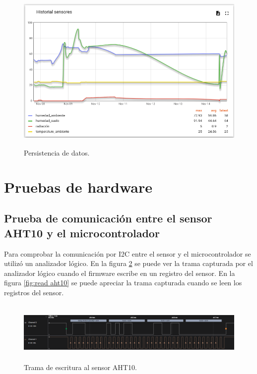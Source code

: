 \begin{figure}[h!]
  \centering
    \includegraphics[width=\linewidth, height=8cm]{./Figures/persistencia_datos4.png}
  \caption{Persistencia de datos.}
    \label{fig:Persistencia de datos}
\end{figure}

\section{Pruebas de hardware}
\subsection{Prueba de comunicación entre el sensor AHT10 y el microcontrolador}
Para comprobar la comunicación por I2C entre el sensor y el microcontrolador se utilizó un analizador lógico.
En la figura \ref{fig:write aht10} se puede ver la trama capturada por el analizador lógico cuando el firmware escribe en un registro del sensor.
En la figura \ref{fig:read aht10} se puede apreciar la trama capturada cuando se leen los registros del sensor.

\begin{figure}[h!]
  \centering
    \includegraphics[width=\linewidth, height=3cm]{./Figures/write_i2c.png}
  \caption{Trama de escritura al sensor AHT10.}
    \label{fig:write aht10}
\end{figure}

